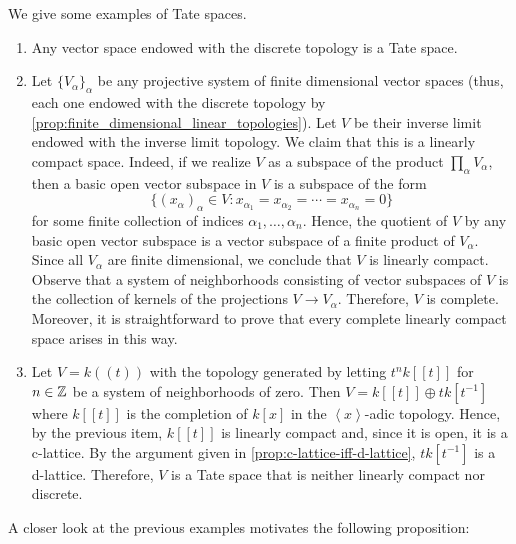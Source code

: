 \begin{example}\label{ex:tate-spaces}
We give some examples of Tate spaces.
\begin{enumerate}[label = (\alph*)]
	\item Any vector space endowed with the discrete topology is a Tate space.
	\item Let $\{V_{\alpha}\}_{\alpha}$ be any projective system of finite dimensional vector spaces (thus, each one endowed with the discrete topology by \cref{prop:finite_dimensional_linear_topologies}). Let $V$ be their inverse limit endowed with the inverse limit topology. We claim that this is a linearly compact space. Indeed, if we realize $V$ as a subspace of the product $\prod_{\alpha} V_{\alpha}$, then a basic open vector subspace in $V$ is a subspace of the form
	\[
	\{(x_{\alpha})_{\alpha} \in V \colon x_{\alpha_{1}} = x_{\alpha_{2}} = \cdots = x_{\alpha_{n}} = 0\}
	\] for some finite collection of indices $\alpha_{1}, \ldots, \alpha_{n}$. Hence, the quotient of $V$ by any basic open vector subspace is a vector subspace of a finite product of $V_{\alpha}$. Since all $V_{\alpha}$ are finite dimensional, we conclude that $V$ is linearly compact. Observe that a system of neighborhoods consisting of vector subspaces of $V$ is the collection of kernels of the projections $V \to V_{\alpha}$. Therefore, $V$ is complete. Moreover, it is straightforward to prove that every complete linearly compact space arises in this way.

	\item Let $V = k\left((t)\right)$ with the topology generated by letting $t^{n}k\left[[t]\right]$ for $n \in {\mathbb Z}$ be a system of neighborhoods of zero. Then $V = k\left[[t]\right] \oplus t k[t^{-1}]$ where $k\left[[t]\right]$ is the completion of $k[x]$ in the $\left\langle x\right\rangle$-adic topology. Hence, by the previous item, $k\left[[t]\right]$ is linearly compact and, since it is open, it is a c-lattice. By the argument given in \cref{prop:c-lattice-iff-d-lattice}, $t k[t^{-1}]$ is a d-lattice. Therefore, $V$ is a Tate space that is neither linearly compact nor discrete.
	\end{enumerate}
\end{example}
A closer look at the previous examples motivates the following proposition:
